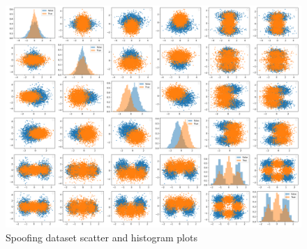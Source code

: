 \begin{figure}[htbp]
    \centering
    \includegraphics[width=0.9\linewidth]{lab02/scatter.png} %
    \caption{Spoofing dataset scatter and histogram plots}
    \label{fig:scatter}
\end{figure}